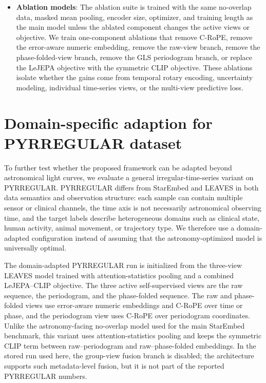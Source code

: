 \begin{itemize}
    \item \textbf{Ablation models}: The ablation suite is trained with the same
    no-overlap data, masked mean pooling, encoder size, optimizer, and training
    length as the main model unless the ablated component changes the active
    views or objective.  We train one-component ablations that remove C-RoPE,
    remove the error-aware numeric embedding, remove the raw-view branch, remove
    the phase-folded-view branch, remove the GLS periodogram branch, or replace
    the LeJEPA objective with the symmetric CLIP objective.  These ablations
    isolate whether the gains come from temporal rotary encoding, uncertainty
    modeling, individual time-series views, or the multi-view predictive loss.
\end{itemize}

\section{Domain-specific adaption for PYRREGULAR dataset}
\label{app:pyrregularadaption}

To further test whether the proposed framework can be adapted beyond
astronomical light curves, we evaluate a general irregular-time-series variant
on PYRREGULAR.  PYRREGULAR differs from StarEmbed and LEAVES in both data
semantics and observation structure: each sample can contain multiple sensor or
clinical channels, the time axis is not necessarily astronomical observing
time, and the target labels describe heterogeneous domains such as clinical
state, human activity, animal movement, or trajectory type.  We therefore use a
domain-adapted configuration instead of assuming that the astronomy-optimized
model is universally optimal.

The domain-adapted PYRREGULAR run is initialized from the three-view LEAVES
model trained with attention-statistics pooling and a combined LeJEPA--CLIP
objective.  The three active self-supervised views are the raw sequence, the
periodogram, and the phase-folded sequence.  The raw and phase-folded views use
error-aware numeric embeddings and C-RoPE over time or phase, and the
periodogram view uses C-RoPE over periodogram coordinates.  Unlike the
astronomy-facing no-overlap model used for the main StarEmbed benchmark, this
variant uses attention-statistics pooling and keeps the symmetric CLIP term
between raw--periodogram and raw--phase-folded embeddings.  In the stored run
used here, the group-view fusion branch is disabled; the architecture supports
such metadata-level fusion, but it is not part of the reported PYRREGULAR
numbers.

